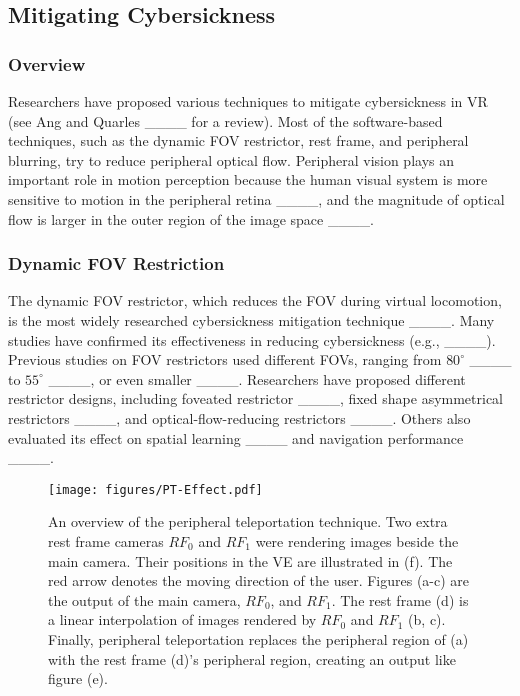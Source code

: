 \subsection{Mitigating Cybersickness}
\subsubsection{Overview}
Researchers have proposed various techniques to mitigate cybersickness in VR (see Ang and Quarles ____ for a review).
Most of the software-based techniques, such as the dynamic FOV restrictor, rest frame, and peripheral blurring, try to reduce peripheral optical flow.
Peripheral vision plays an important role in motion perception because the human visual system is more sensitive to motion in the peripheral retina ____, and the magnitude of optical flow is larger in the outer region of the image space ____.

\subsubsection{Dynamic FOV Restriction}
The dynamic FOV restrictor, which reduces the FOV during virtual locomotion, is the most widely researched cybersickness mitigation technique ____. 
Many studies have confirmed its effectiveness in reducing cybersickness 
(e.g., ____).
Previous studies on FOV restrictors used different FOVs, ranging from $80^\circ$ ____ to $55^\circ$ ____, or even smaller ____.
Researchers have proposed different restrictor designs, including foveated restrictor ____, fixed shape asymmetrical restrictors ____, and optical-flow-reducing restrictors ____.
Others also evaluated its effect on spatial learning ____ and navigation performance ____. 

\begin{figure*}[t]
    \centering
    \texttt{[image: figures/PT-Effect.pdf]}
    \caption{An overview of the peripheral teleportation technique. 
    Two extra rest frame cameras $RF_0$ and $RF_1$ were rendering images beside the main camera. 
    Their positions in the VE are illustrated in (f).
    The red arrow denotes the moving direction of the user.
    Figures (a-c) are the output of the main camera, $RF_0$, and $RF_1$.
    The rest frame (d) is a linear interpolation of images rendered by $RF_0$ and $RF_1$ (b, c).
    Finally, peripheral teleportation replaces the peripheral region of (a) with the rest frame (d)'s peripheral region, creating an output like figure (e).
    }
    \label{fig:pt_space}
\end{figure*}

